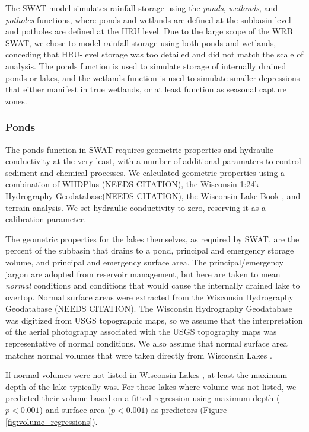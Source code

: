 The SWAT model simulates rainfall storage using the \textit{ponds}, \textit{wetlands}, and \textit{potholes} functions, where ponds and wetlands are defined at the subbasin level and potholes are defined at the HRU level. Due to the large scope of the WRB SWAT, we chose to model rainfall storage using both ponds and wetlands, conceding that HRU-level storage was too detailed and did not match the scale of analysis. The ponds function is used to simulate storage of internally drained ponds or lakes, and the wetlands function is used to simulate smaller depressions that either manifest in true wetlands, or at least function as seasonal capture zones.

\subsubsection{Ponds}\label{sec:ponds}

The ponds function in SWAT requires geometric properties and hydraulic conductivity at the very least, with a number of additional paramaters to control sediment and chemical processes. We calculated geometric properties using a combination of WHDPlus (NEEDS CITATION), the Wisconsin 1:24k Hydrography Geodatabase(NEEDS CITATION), the Wisconsin Lake Book \citep{wisconsin_wisconsin_lakes_2009}, and terrain analysis. We set hydraulic conductivity to zero, reserving it as a calibration parameter.

The geometric properties for the lakes themselves, as required by SWAT, are the percent of the subbasin that drains to a pond, principal and emergency storage volume, and principal and emergency surface area. The principal/emergency jargon are adopted from reservoir management, but here are taken to mean \textit{normal} conditions and conditions that would cause the internally drained lake to overtop. Normal surface areas were extracted from the Wisconsin Hydrography Geodatabase (NEEDS CITATION). The Wisconsin Hydrography Geodatabase was digitized from USGS topographic maps, so we assume that the interpretation of the aerial photography associated with the USGS topography maps was representative of normal conditions.  We also assume that normal surface area matches normal volumes that were taken directly from Wisconsin Lakes \cite{wisconsin_wisconsin_lakes_2009}.

If normal volumes were not listed in Wisconsin Lakes \cite{wisconsin_wisconsin_lakes_2009}, at least the maximum depth of the lake typically was. For those lakes where volume was not listed, we predicted their volume based on a fitted regression using maximum depth ($p < 0.001$) and surface area ($p < 0.001$) as predictors (Figure \ref{fig:volume_regressions}).

